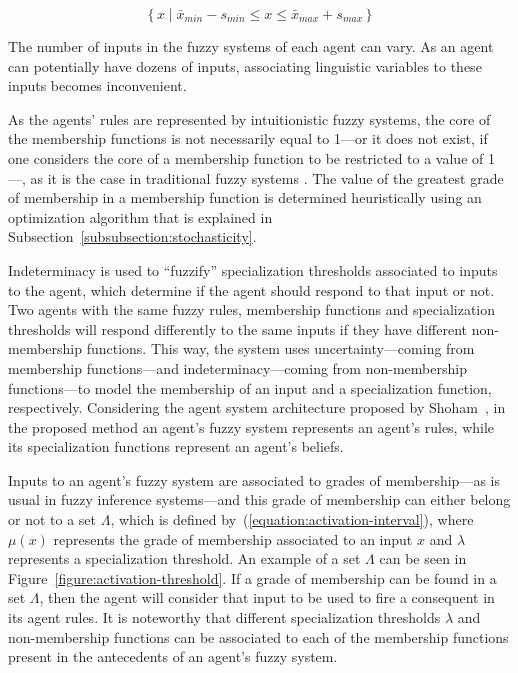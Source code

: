 \documentclass{ieeeaccess}
\begin{document}
\begin{equation}
  \label{equation:ant-con-domain}
  \{\,x \mid \bar{x}_{min} - s_{min} \leq x \leq \bar{x}_{max} + s_{max} \,\}
\end{equation}

The number of inputs in the fuzzy systems of each agent can vary. As
an agent can potentially have dozens of inputs, associating linguistic
variables to these inputs becomes inconvenient.

As the agents' rules are represented by intuitionistic fuzzy systems, the core of the membership functions is not necessarily equal to 1---or it does not exist, if one considers the core of a membership function to be restricted to a value of 1---, as it is the case in traditional fuzzy systems \cite{wygralak2000axiomatic}. %
The value of the greatest grade of membership in a membership function is determined heuristically using an optimization algorithm that is explained in Subsection~\ref{subsubsection:stochasticity}.

Indeterminacy is used to ``fuzzify'' specialization thresholds associated to inputs to the agent, which determine if the agent should respond to that
input or not. Two agents with the same fuzzy rules, membership functions and specialization thresholds will respond differently to the
same inputs if they have different non-membership functions. This way, the system uses uncertainty---coming from membership functions---and
indeterminacy---coming from non-membership functions---to model the membership of an input and a specialization function, respectively. Considering the agent system architecture proposed by Shoham~\cite{Shoham1993}, in the proposed method an agent's fuzzy system represents an agent's rules, while its specialization functions represent an agent's beliefs.

Inputs to an agent's fuzzy system are associated to grades of membership---as is usual in fuzzy inference systems---and this grade of membership can either belong or not to a set $\Lambda$, which is defined by~(\ref{equation:activation-interval}), where $\mu(x)$ represents the grade of membership associated to an input $x$ and $\lambda$ represents a specialization threshold. An example of a set $\Lambda$ can be seen in Figure~\ref{figure:activation-threshold}. If a grade of membership can be found in a set $\Lambda$, then the agent will consider that input to be used to fire a consequent in its agent
rules. It is noteworthy that different specialization thresholds $\lambda$ and non-membership functions can be associated to each of the
membership functions present in the antecedents of an agent's fuzzy system.
\end{document}
